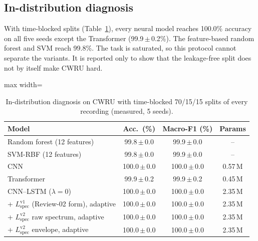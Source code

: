 \documentclass[conference]{IEEEtran}
\begin{document}
\subsection{In-distribution diagnosis}
With time-blocked splits (Table~\ref{tab:indist}), every neural model reaches
100.0\% accuracy on all five seeds except the Transformer
(99.9\,$\pm$\,0.2\%). The feature-based random forest and SVM reach 99.8\%. The
task is saturated, so this protocol cannot separate the variants. It is
reported only to show that the leakage-free split does not by itself make CWRU
hard.

\begin{table}[t]
\caption{In-distribution diagnosis on CWRU with time-blocked 70/15/15 splits of every recording (measured, 5 seeds).}
\label{tab:indist}
\centering
\footnotesize
\begin{adjustbox}{max width=\columnwidth}
\begin{tabular}{lccc}
\toprule
Model & Acc.\ (\%) & Macro-F1 (\%) & Params \\
\midrule
Random forest (12 features) & 99.8\,$\pm$\,0.0 & 99.9\,$\pm$\,0.0 & -- \\
SVM-RBF (12 features) & 99.8\,$\pm$\,0.0 & 99.9\,$\pm$\,0.0 & -- \\
CNN & 100.0\,$\pm$\,0.0 & 100.0\,$\pm$\,0.0 & 0.57\,M \\
Transformer & 99.9\,$\pm$\,0.2 & 99.9\,$\pm$\,0.2 & 0.45\,M \\
CNN--LSTM ($\lambda=0$) & 100.0\,$\pm$\,0.0 & 100.0\,$\pm$\,0.0 & 2.35\,M \\
\midrule
+ $L_{\mathrm{spec}}^{\mathrm{v1}}$ (Review-02 form), adaptive & 100.0\,$\pm$\,0.0 & 100.0\,$\pm$\,0.0 & 2.35\,M \\
+ $L_{\mathrm{spec}}^{\mathrm{v2}}$ raw spectrum, adaptive & 100.0\,$\pm$\,0.0 & 100.0\,$\pm$\,0.0 & 2.35\,M \\
+ $L_{\mathrm{spec}}^{\mathrm{v2}}$ envelope, adaptive & 100.0\,$\pm$\,0.0 & 100.0\,$\pm$\,0.0 & 2.35\,M \\
\bottomrule
\end{tabular}
\end{adjustbox}
\end{table}
\end{document}
